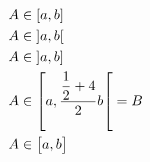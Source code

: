 \documentclass[a4paper,10pt]{article}
\begin{document}

\begin{align*}
	& A \in \interval{a}{b} \\
	& A \in \interval[open]{a}{b} \\
	& A \in \interval[open left]{a}{b} \\
	& A \in \interval[open right, scaled]{a}{\frac{\dfrac12 + 4}2b} = B \\
	& A \in \interval[scaled=\big]{a}{b}
\end{align*}
\end{document}
